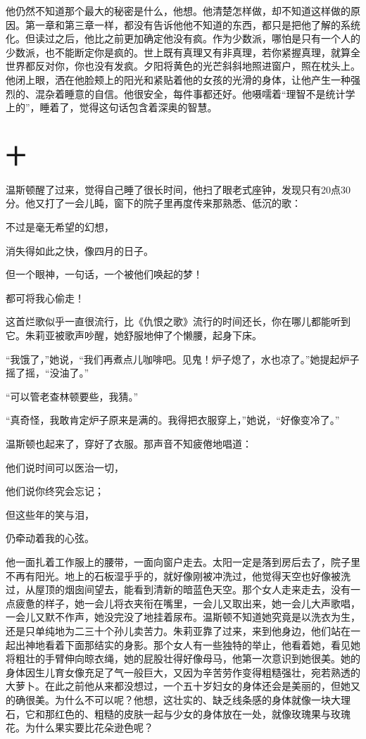 他仍然不知道那个最大的秘密是什么，他想。他清楚怎样做，却不知道这样做的原因。第一章和第三章一样，都没有告诉他他不知道的东西，都只是把他了解的系统化。但读过之后，他比之前更加确定他没有疯。作为少数派，哪怕是只有一个人的少数派，也不能断定你是疯的。世上既有真理又有非真理，若你紧握真理，就算全世界都反对你，你也没有发疯。夕阳将黄色的光芒斜斜地照进窗户，照在枕头上。他闭上眼，洒在他脸颊上的阳光和紧贴着他的女孩的光滑的身体，让他产生一种强烈的、混杂着睡意的自信。他很安全，每件事都还好。他嗫嚅着``理智不是统计学上的''，睡着了，觉得这句话包含着深奥的智慧。

\section*{十}\label{ux5341ux516b}

温斯顿醒了过来，觉得自己睡了很长时间，他扫了眼老式座钟，发现只有20点30分。他又打了一会儿盹，窗下的院子里再度传来那熟悉、低沉的歌：

不过是毫无希望的幻想，

消失得如此之快，像四月的日子。

但一个眼神，一句话，一个被他们唤起的梦！

都可将我心偷走！

这首烂歌似乎一直很流行，比《仇恨之歌》流行的时间还长，你在哪儿都能听到它。朱莉亚被歌声吵醒，她舒服地伸了个懒腰，起身下床。

``我饿了，''她说，``我们再煮点儿咖啡吧。见鬼！炉子熄了，水也凉了。''她提起炉子摇了摇，``没油了。''

``可以管老查林顿要些，我猜。''

``真奇怪，我敢肯定炉子原来是满的。我得把衣服穿上，''她说，``好像变冷了。''

温斯顿也起来了，穿好了衣服。那声音不知疲倦地唱道：

他们说时间可以医治一切，

他们说你终究会忘记；

但这些年的笑与泪，

仍牵动着我的心弦。

他一面扎着工作服上的腰带，一面向窗户走去。太阳一定是落到房后去了，院子里不再有阳光。地上的石板湿乎乎的，就好像刚被冲洗过，他觉得天空也好像被洗过，从屋顶的烟囱间望去，能看到清新的暗蓝色天空。那个女人走来走去，没有一点疲惫的样子，她一会儿将衣夹衔在嘴里，一会儿又取出来，她一会儿大声歌唱，一会儿又默不作声，她没完没了地挂着尿布。温斯顿不知道她究竟是以洗衣为生，还是只单纯地为二三十个孙儿卖苦力。朱莉亚靠了过来，来到他身边，他们站在一起出神地看着下面那结实的身影。那个女人有一些独特的举止，他看着她，看见她将粗壮的手臂伸向晾衣绳，她的屁股壮得好像母马，他第一次意识到她很美。她的身体因生儿育女像充足了气一般巨大，又因为辛苦劳作变得粗糙强壮，宛若熟透的大萝卜。在此之前他从来都没想过，一个五十岁妇女的身体还会是美丽的，但她又的确很美。为什么不可以呢？他想，这壮实的、缺乏线条感的身体就像一块大理石，它和那红色的、粗糙的皮肤一起与少女的身体放在一处，就像玫瑰果与玫瑰花。为什么果实要比花朵逊色呢？


